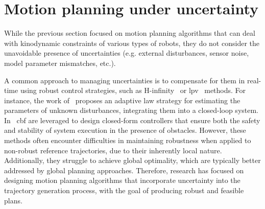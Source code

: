 

\section{Motion planning under uncertainty}\label{sec:planuncertainty}

While the previous section focused on motion planning algorithms that can deal with kinodynamic constraints of various types of robots, they do not consider the unavoidable presence of uncertainties (e.g. external disturbances, sensor noise, model parameter mismatches, etc.).

A common approach to managing uncertainties is to compensate for them in real-time using robust control strategies, such as H-infinity~\cite{cHinf} or \gls{lpv}~\cite{cLPV} methods.
For instance, the work of~\cite{cCastillo} proposes an adaptive law strategy for estimating the parameters of unknown disturbances, integrating them into a closed-loop system.
In~\cite{cMarilena} \gls{cbf} are leveraged to design closed-form controllers that ensure both the safety and stability of system execution in the presence of obstacles.
However, these methods often encounter difficulties in maintaining robustness when applied to non-robust reference trajectories, due to their inherently local nature.
Additionally, they struggle to achieve global optimality, which are typically better addressed by global planning approaches.
Therefore, research has focused on designing motion planning algorithms that incorporate uncertainty into the trajectory generation process, with the goal of producing robust and feasible plans.

